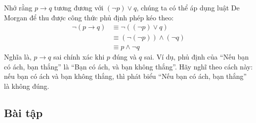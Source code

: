 Nhớ rằng $p \to q$ tương đương với $(\lnot p) \lor q$, chúng ta có thể áp dụng luật De Morgan để thu được công thức phủ định phép kéo theo:
\begin{align*}
\lnot(p \to q) &\equiv \lnot((\lnot p) \lor q) \\
&\equiv (\lnot(\lnot p)) \land (\lnot q) \\
&\equiv p \land \lnot q
\end{align*}
Nghĩa là, $p \to q$ sai chính xác khi $p$ đúng và $q$ sai. Ví dụ, phủ định của ``Nếu bạn có ách, bạn thắng'' là ``Bạn có ách, và bạn không thắng''. Hãy nghĩ theo cách này: nếu bạn có ách và bạn không thắng, thì phát biểu ``Nếu bạn có ách, bạn thắng'' là không đúng.

\subsection*{Bài tập}

